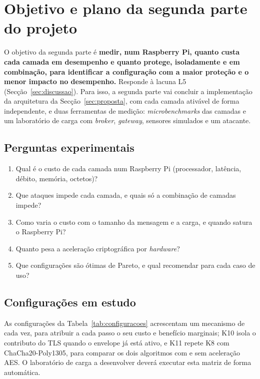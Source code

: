 \section{Objetivo e plano da segunda parte do projeto}
\label{sec:plano}

O objetivo da segunda parte é \textbf{medir, num Raspberry Pi, quanto custa cada
camada em desempenho e quanto protege, isoladamente e em combinação, para
identificar a configuração com a maior proteção e o menor impacto no desempenho.}
Responde à lacuna L5 (Secção~\ref{sec:discussao}). Para isso, a segunda parte vai
concluir a implementação da arquitetura da Secção~\ref{sec:proposta}, com cada camada ativável
de forma independente, e duas ferramentas de medição: \emph{microbenchmarks} das
camadas e um laboratório de carga com \emph{broker}, \emph{gateway}, sensores
simulados e um atacante.

\subsection{Perguntas experimentais}

\begin{enumerate}[label=\textbf{QP\arabic*.}, leftmargin=*]
  \item Qual é o custo de cada camada num Raspberry Pi (processador, latência,
    débito, memória, octetos)?
  \item Que ataques impede cada camada, e quais só a combinação de camadas impede?
  \item Como varia o custo com o tamanho da mensagem e a carga, e quando satura o
    Raspberry Pi?
  \item Quanto pesa a aceleração criptográfica por \emph{hardware}?
  \item Que configurações são ótimas de Pareto, e qual recomendar para cada caso de
    uso?
\end{enumerate}

\subsection{Configurações em estudo}
\label{sec:configuracoes}

As configurações da Tabela~\ref{tab:configuracoes} acrescentam um mecanismo de
cada vez, para atribuir a cada passo o seu custo e benefício marginais; K10 isola o
contributo do TLS quando o envelope já está ativo, e K11 repete K8 com
ChaCha20-Poly1305, para comparar os dois algoritmos com e sem aceleração AES. O laboratório de carga a
desenvolver deverá executar esta matriz de forma automática.


